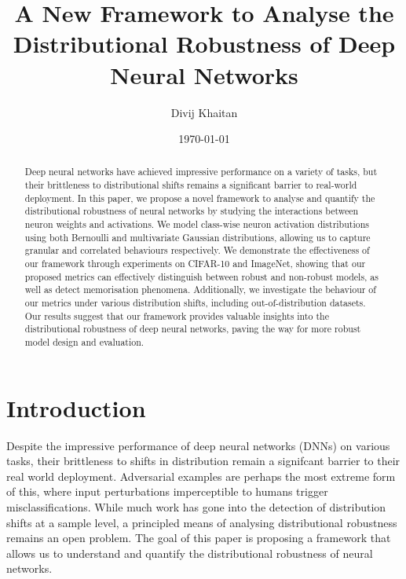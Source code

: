 \documentclass{article}
\title{A New Framework to Analyse the Distributional Robustness of Deep Neural Networks}
\author{Divij Khaitan}
\date{\today}
\begin{document}
    \maketitle

    \begin{abstract}
        Deep neural networks have achieved impressive performance on a variety of tasks, but their brittleness to distributional shifts remains a significant barrier to real-world deployment. In this paper, we propose a novel framework to analyse and quantify the distributional robustness of neural networks by studying the interactions between neuron weights and activations. We model class-wise neuron activation distributions using both Bernoulli and multivariate Gaussian distributions, allowing us to capture granular and correlated behaviours respectively. We demonstrate the effectiveness of our framework through experiments on CIFAR-10 and ImageNet, showing that our proposed metrics can effectively distinguish between robust and non-robust models, as well as detect memorisation phenomena. Additionally, we investigate the behaviour of our metrics under various distribution shifts, including out-of-distribution datasets. Our results suggest that our framework provides valuable insights into the distributional robustness of deep neural networks, paving the way for more robust model design and evaluation.
    \end{abstract}

    \section{Introduction}
        Despite the impressive performance of deep neural networks (DNNs) on various tasks, their brittleness to shifts in distribution remain a signifcant barrier to their real world deployment. Adversarial examples are perhaps the most extreme form of this, where input perturbations imperceptible to humans trigger misclassifications. While much work has gone into the detection of distribution shifts at a sample level, a principled means of analysing distributional robustness remains an open problem. The goal of this paper is proposing a framework that allows us to understand and quantify the distributional robustness of neural networks. 
\end{document}
